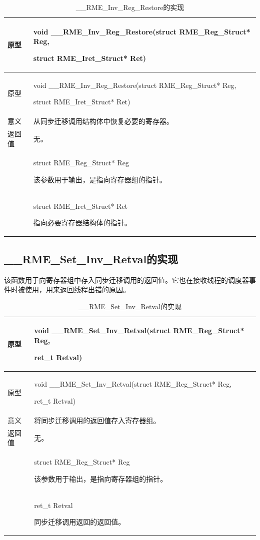 \begin{xltabular}{\textwidth}{@{}>{\hsize\raggedright\arraybackslash}X>{\hsize\raggedright\arraybackslash}X@{}}
\caption{\_\_RME\_Inv\_Reg\_Restore的实现}\label{tab:7-67-rme-inv-reg-restore-implementation}\\
\toprule
原型\strut
 & void \_\_RME\_Inv\_Reg\_Restore(struct RME\_Reg\_Struct* Reg,

struct RME\_Iret\_Struct* Ret)\strut
\tabularnewline
\endfirsthead
\toprule
原型\strut
 & void \_\_RME\_Inv\_Reg\_Restore(struct RME\_Reg\_Struct* Reg,

struct RME\_Iret\_Struct* Ret)\strut
\tabularnewline
\midrule
\endhead
\bottomrule
\endlastfoot
意义 & 从同步迁移调用结构体中恢复必要的寄存器。\tabularnewline
返回值 & 无。\tabularnewline
{} & struct RME\_Reg\_Struct* Reg

该参数用于输出，是指向寄存器组的指针。\strut
\tabularnewline
\strut
 & struct RME\_Iret\_Struct* Ret

指向必要寄存器结构体的指针。\strut
\tabularnewline
\end{xltabular}

\subsection{\_\_RME\_Set\_Inv\_Retval的实现}\label{subsec:7-rme-set-inv-retval-implementation}

该函数用于向寄存器组中存入同步迁移调用的返回值。它也在接收线程的调度器事件时被使用，用来返回线程出错的原因。

\begin{xltabular}{\textwidth}{@{}>{\hsize\raggedright\arraybackslash}X>{\hsize\raggedright\arraybackslash}X@{}}
\caption{\_\_RME\_Set\_Inv\_Retval的实现}\label{tab:7-68-rme-set-inv-retval-implementation}\\
\toprule
原型\strut
 & void \_\_RME\_Set\_Inv\_Retval(struct RME\_Reg\_Struct* Reg,

ret\_t Retval)\strut
\tabularnewline
\endfirsthead
\toprule
原型\strut
 & void \_\_RME\_Set\_Inv\_Retval(struct RME\_Reg\_Struct* Reg,

ret\_t Retval)\strut
\tabularnewline
\midrule
\endhead
\bottomrule
\endlastfoot
意义 & 将同步迁移调用的返回值存入寄存器组。\tabularnewline
返回值 & 无。\tabularnewline
{} & struct RME\_Reg\_Struct* Reg

该参数用于输出，是指向寄存器组的指针。\strut
\tabularnewline
\strut
 & ret\_t Retval

同步迁移调用返回的返回值。\strut
\tabularnewline
\end{xltabular}

